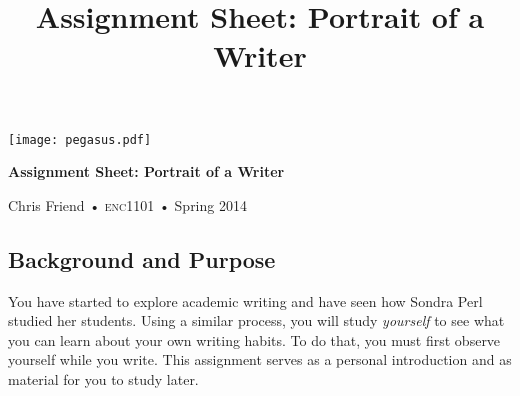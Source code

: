 \documentclass[10pt, oneside]{amsart}	%
\title[Portrait of a Writer]{Assignment Sheet: Portrait of a Writer}
\begin{document}
%

\vspace{-2in}
\begin{center}
\huge
\texttt{[image: pegasus.pdf]}

\textbf{Assignment Sheet: Portrait of a Writer}

{\normalsize Chris Friend • \textsc{enc1101} • Spring 2014}
\end{center}
\vspace{1\baselineskip}

\begin{multicols}{2}
\thispagestyle{empty}
	\section{Background and Purpose} %
	\label{sec:purpose}
	You have started to explore academic writing and have seen how Sondra Perl studied her students. Using a similar process, you will study \emph{yourself} to see what you can learn about your own writing habits. To do that, you must first observe yourself while you write. This assignment serves as a personal introduction and as material for you to study later.


\end{multicols}
\end{document}
